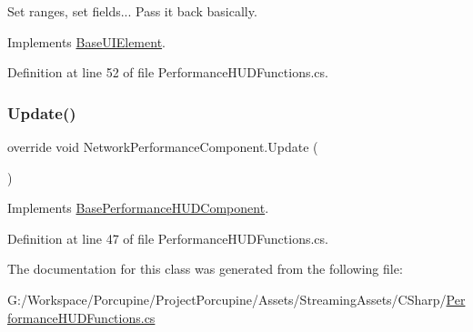 Set ranges, set fields... Pass it back basically. 



Implements \hyperlink{class_base_u_i_element_a9a0aa6ac0b194f90e092b372adce4e30}{Base\+U\+I\+Element}.



Definition at line 52 of file Performance\+H\+U\+D\+Functions.\+cs.

\mbox{\label{class_network_performance_component_a2742830b63cb6b4a70dedcb670d91d29}} 
\subsubsection{\texorpdfstring{Update()}{Update()}}
{\footnotesize\ttfamily override void Network\+Performance\+Component.\+Update (\begin{DoxyParamCaption}{ }\end{DoxyParamCaption})\hspace{0.3cm}{\ttfamily [virtual]}}



Implements \hyperlink{class_base_performance_h_u_d_component_a7a585b4c22bd5b3daee51bf126fa1cec}{Base\+Performance\+H\+U\+D\+Component}.



Definition at line 47 of file Performance\+H\+U\+D\+Functions.\+cs.



The documentation for this class was generated from the following file\+:\begin{DoxyCompactItemize}
\item 
G\+:/\+Workspace/\+Porcupine/\+Project\+Porcupine/\+Assets/\+Streaming\+Assets/\+C\+Sharp/\hyperlink{_performance_h_u_d_functions_8cs}{Performance\+H\+U\+D\+Functions.\+cs}\end{DoxyCompactItemize}

